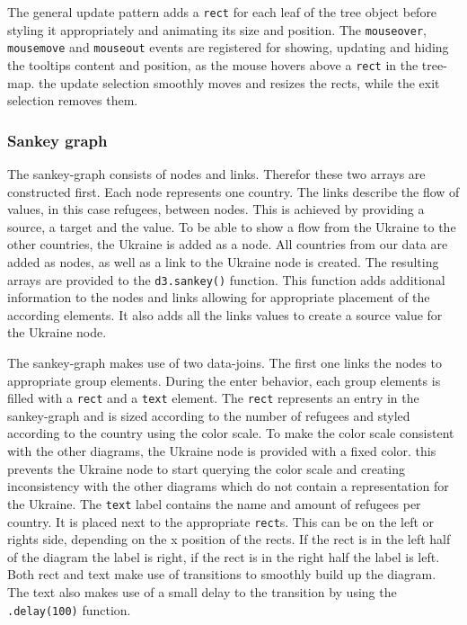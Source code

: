 The general update pattern adds a \texttt{rect} for each leaf of the tree object before styling it appropriately and animating its size and position. The \texttt{mouseover}, \texttt{mousemove} and \texttt{mouseout} events are registered for showing, updating and hiding the tooltips content and position, as the mouse hovers above a \texttt{rect} in the tree-map. the update selection smoothly moves and resizes the rects, while the exit selection removes them.


\subsubsection{Sankey graph}
The sankey-graph consists of nodes and links. Therefor these two arrays are constructed first. Each node represents one country. The links describe the flow of values, in this case refugees, between nodes. This is achieved by providing a source, a target and the value. To be able to show a flow from the Ukraine to the other countries, the Ukraine is added as a node. All countries from our data are added as nodes, as well as a link to the Ukraine node is created. The resulting arrays are provided to the \texttt{d3.sankey()} function. This function adds additional information to the nodes and links allowing for appropriate placement of the according elements. It also adds all the links values to create a source value for the Ukraine node.

The sankey-graph makes use of two data-joins. The first one links the nodes to appropriate group elements. During the enter behavior, each group elements is filled with a \texttt{rect} and a \texttt{text} element. The \texttt{rect} represents an entry in the sankey-graph and is sized according to the number of refugees and styled according to the country using the color scale. To make the color scale consistent with the other diagrams, the Ukraine node is provided with a fixed color. this prevents the Ukraine node to start querying the color scale and creating inconsistency with the other diagrams which do not contain a representation for the Ukraine. The \texttt{text} label contains the name and amount of refugees per country. It is placed next to the appropriate \texttt{rect}s. This can be on the left or rights side, depending on the x position of the rects. If the rect is in the left half of the diagram the label is right, if the rect is in the right half the label is left. Both rect and text make use of transitions to smoothly build up the diagram. The text also makes use of a small delay to the transition by using the \texttt{.delay(100)} function.

